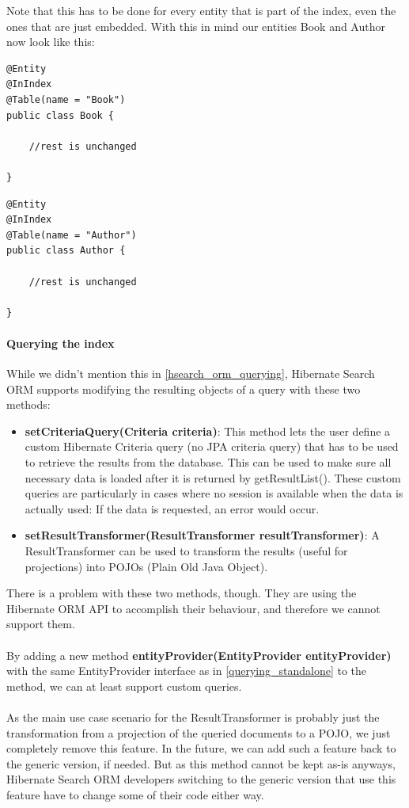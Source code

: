 \noindent
Note that this has to be done for every entity that is part of the index, even the ones that are just embedded. With this in mind our entities Book and Author now look like this:
\\
\lstset{language=java}
\begin{lstlisting}[frame=htrbl, caption={Book.java with @InIndex}, label={lst:book.java_2}]
@Entity
@InIndex
@Table(name = "Book")
public class Book {
	
	//rest is unchanged

}
\end{lstlisting}

\lstset{language=java}
\begin{lstlisting}[frame=htrbl, caption={Author.java with @InIndex}, label={lst:author.java_2}]
@Entity
@InIndex
@Table(name = "Author")
public class Author {
	
	//rest is unchanged
	
}
\end{lstlisting}

\paragraph{Querying the index}
While we didn't mention this in \ref{hsearch_orm_querying}, Hibernate Search ORM supports modifying the resulting objects of a query with these two methods:

\begin{itemize}
	\item \textbf{setCriteriaQuery(Criteria criteria)}:
		This method lets the user define a custom Hibernate Criteria query (no JPA criteria query) that has to be used to retrieve the results from the database. This can be used to make sure all necessary data is loaded after it is returned by getResultList(). These custom queries are  particularly in cases where no session is available when the data is actually used: If the data is requested, an error would occur.
	\item \textbf{setResultTransformer(ResultTransformer resultTransformer)}:
		A ResultTransformer can be used to transform the results (useful for projections) into POJOs (Plain Old Java Object).
\end{itemize}
\noindent
There is a problem with these two methods, though. They are using the Hibernate ORM API to accomplish their behaviour, and therefore we cannot support them.
\\\\
By adding a new method \textbf{entityProvider(EntityProvider entityProvider)} with the same EntityProvider interface as in \ref{querying_standalone} to the method, we can at least support custom queries. 
\\\\
As the main use case scenario for the ResultTransformer is probably just the transformation from a projection of the queried documents to a POJO, we just completely remove this feature. In the future, we can add such a feature back to the generic version, if needed. But as this method cannot be kept as-is anyways, Hibernate Search ORM developers switching to the generic version that use this feature have to change some of their code either way.

